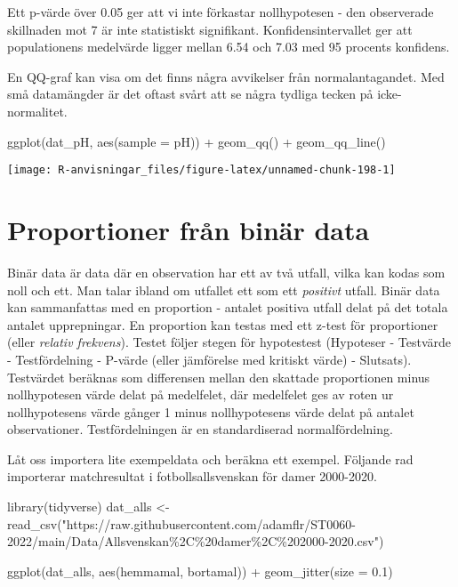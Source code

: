 \documentclass[
]{book}
\newenvironment{Shaded}{\begin{snugshade}}{\end{snugshade}}
\newcommand{\AttributeTok}[1]{\textcolor[rgb]{0.77,0.63,0.00}{#1}}
\newcommand{\FloatTok}[1]{\textcolor[rgb]{0.00,0.00,0.81}{#1}}
\newcommand{\FunctionTok}[1]{\textcolor[rgb]{0.00,0.00,0.00}{#1}}
\newcommand{\NormalTok}[1]{#1}
\newcommand{\OtherTok}[1]{\textcolor[rgb]{0.56,0.35,0.01}{#1}}
\newcommand{\SpecialCharTok}[1]{\textcolor[rgb]{0.00,0.00,0.00}{#1}}
\newcommand{\StringTok}[1]{\textcolor[rgb]{0.31,0.60,0.02}{#1}}
\theoremstyle{definition}
\theoremstyle{definition}
\theoremstyle{definition}
\theoremstyle{definition}
\theoremstyle{remark}
\begin{document}
Ett p-värde över 0.05 ger att vi inte förkastar nollhypotesen - den observerade skillnaden mot 7 är inte statistiskt signifikant. Konfidensintervallet ger att populationens medelvärde ligger mellan 6.54 och 7.03 med 95 procents konfidens.

En QQ-graf kan visa om det finns några avvikelser från normalantagandet. Med små datamängder är det oftast svårt att se några tydliga tecken på icke-normalitet.

\begin{Shaded}
\begin{Highlighting}[]
\FunctionTok{ggplot}\NormalTok{(dat\_pH, }\FunctionTok{aes}\NormalTok{(}\AttributeTok{sample =}\NormalTok{ pH)) }\SpecialCharTok{+}
  \FunctionTok{geom\_qq}\NormalTok{() }\SpecialCharTok{+}
  \FunctionTok{geom\_qq\_line}\NormalTok{()}
\end{Highlighting}
\end{Shaded}

\begin{center}\texttt{[image: R-anvisningar\_files/figure-latex/unnamed-chunk-198-1]} \end{center}

\hypertarget{proportioner-fruxe5n-binuxe4r-data}{%
\section{Proportioner från binär data}\label{proportioner-fruxe5n-binuxe4r-data}}

Binär data är data där en observation har ett av två utfall, vilka kan kodas som noll och ett. Man talar ibland om utfallet ett som ett \emph{positivt} utfall. Binär data kan sammanfattas med en proportion - antalet positiva utfall delat på det totala antalet upprepningar. En proportion kan testas med ett z-test för proportioner (eller \emph{relativ frekvens}). Testet följer stegen för hypotestest (Hypoteser - Testvärde - Testfördelning - P-värde (eller jämförelse med kritiskt värde) - Slutsats). Testvärdet beräknas som differensen mellan den skattade proportionen minus nollhypotesen värde delat på medelfelet, där medelfelet ges av roten ur nollhypotesens värde gånger 1 minus nollhypotesens värde delat på antalet observationer. Testfördelningen är en standardiserad normalfördelning.

Låt oss importera lite exempeldata och beräkna ett exempel. Följande rad importerar matchresultat i fotbollsallsvenskan för damer 2000-2020.

\begin{Shaded}
\begin{Highlighting}[]
\FunctionTok{library}\NormalTok{(tidyverse)}
\NormalTok{dat\_alls }\OtherTok{\textless{}{-}} \FunctionTok{read\_csv}\NormalTok{(}\StringTok{"https://raw.githubusercontent.com/adamflr/ST0060{-}2022/main/Data/Allsvenskan\%2C\%20damer\%2C\%202000{-}2020.csv"}\NormalTok{)}

\FunctionTok{ggplot}\NormalTok{(dat\_alls, }\FunctionTok{aes}\NormalTok{(hemmamal, bortamal)) }\SpecialCharTok{+}
  \FunctionTok{geom\_jitter}\NormalTok{(}\AttributeTok{size =} \FloatTok{0.1}\NormalTok{)}
\end{Highlighting}
\end{Shaded}
\end{document}
